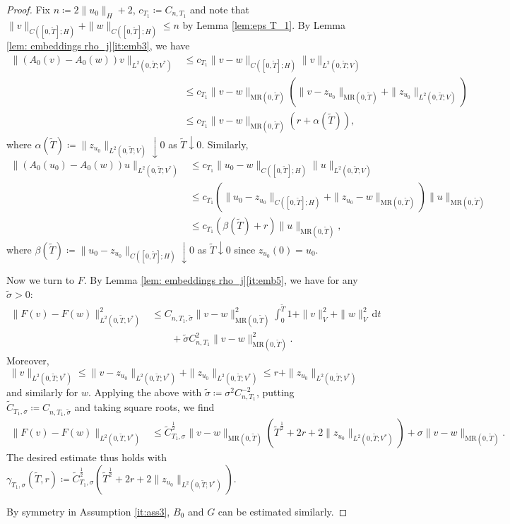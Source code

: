 \documentclass{amsart}
\newcommand{\dd}{\,\mathrm{d}}
\renewcommand{\MR}{\mathrm{MR}}
\newcommand{\<}{\langle}
\newcommand{\?}{\rangle}
\theoremstyle{plain}
\theoremstyle{remark}
\theoremstyle{plain}
\numberwithin{equation}{section}
\begin{document}
\begin{proof}
Fix $n\coloneqq 2\|u_0\|_H+2$, $c_{T_1}\coloneqq C_{n,T_1}$ and note that $\|v\|_{C([0,\tilde{T}];H)}+\|w\|_{C([0,\tilde{T}];H)}\leq n$ by Lemma \ref{lem:eps T_1}. By Lemma \ref{lem: embeddings rho_j}\ref{it:emb3}, we have
\begin{align*}
\|(A_0(v)-A_0(w))v\|_{L^2(0,\tilde{T};V^*)}&\leq c_{T_1}\|v-w\|_{C([0,\tilde{T}];H)}\|v\|_{L^2(0,\tilde{T};V)}\\
&\leq c_{T_1}\|v-w\|_{\MR(0,\tilde{T})}(\|v-z_{u_0}\|_{\MR(0,\tilde{T})}+\|z_{u_0}\|_{L^2(0,\tilde{T};V)})\\
&\leq c_{T_1}\|v-w\|_{\MR(0,\tilde{T})}(r+\alpha(\tilde{T})),
\end{align*}
where $\alpha(\tilde{T})\coloneqq \|z_{u_0}\|_{L^2(0,\tilde{T};V)}\downarrow0$ as $\tilde{T}\downarrow0$.
Similarly,
\begin{align*}
\|(A_0(u_0)-A_0(w))u\|_{L^2(0,\tilde{T};V^*)}&\leq c_{T_1}\|u_0-w\|_{C([0,\tilde{T}];H)}\|u\|_{L^2(0,\tilde{T};V)}\\
& \leq c_{T_1}(\|u_0-z_{u_0}\|_{C([0,\tilde{T}];H)}+\|z_{u_0}-w\|_{\MR(0,\tilde{T})})\|u\|_{\MR(0,\tilde{T})}\\
& \leq c_{T_1}(\beta(\tilde{T})+r)\|u\|_{\MR(0,\tilde{T})},
\end{align*}
where $\beta(\tilde{T})\coloneqq \|u_0-z_{u_0}\|_{C([0,\tilde{T}];H)}\downarrow 0$ as $\tilde{T}\downarrow0$ since $z_{u_0}(0)=u_0$.

Now we turn to $F$. By Lemma \ref{lem: embeddings rho_j}\ref{it:emb5}, we have for any $\tilde{\sigma}>0$:
\begin{align*}
 \|F(v)-F(w)\|_{L^2(0,\tilde{T},V^*)}^2&\leq  
 C_{n,T_1,\tilde{\sigma}}\|v-w\|_{\MR(0,\tilde{T})}^2\int_0^{\tilde{T}} 1+\|v\|_V^2+\|w\|_V^2\dd t\\
 &\qquad +\tilde{\sigma} C_{n,T_1}^2\|v-w\|_{\MR(0,\tilde{T})}^2.
\end{align*}
Moreover,
\[
\|v\|_{L^2(0,\tilde{T};V^*)}\leq \|v-z_{u_0}\|_{L^2(0,\tilde{T};V^*)}+\|z_{u_0}\|_{L^2(0,\tilde{T};V^*)}\leq r +\|z_{u_0}\|_{L^2(0,\tilde{T};V^*)}
\]
and similarly for $w$. Applying the above with $\tilde{\sigma}\coloneqq \sigma^2 C_{n,T_1}^{-2}$, putting $\tilde{C}_{T_1,\sigma}\coloneqq C_{n,T_1,\tilde{\sigma}}$ and taking square roots, we find 
\begin{align*}
 \|F(v)-F(w)\|_{L^2(0,\tilde{T},V^*)}&\leq  
 \tilde{C}_{T_1,{\sigma}}^{\frac{1}{2}}\|v-w\|_{\MR(0,\tilde{T})}(\tilde{T}^{\frac{1}{2}}+2r+2\|z_{u_0}\|_{L^2(0,\tilde{T};V^*)})
 +{\sigma} \|v-w\|_{\MR(0,\tilde{T})}.
\end{align*}
The desired estimate thus holds with $\gamma_{T_1,\sigma}(\tilde{T},r)\coloneqq \tilde{C}_{T_1,{\sigma}}^{\frac{1}{2}}(\tilde{T}^{\frac{1}{2}}+2r+2\|z_{u_0}\|_{L^2(0,\tilde{T};V^*)})$. 

By symmetry in Assumption \ref{it:ass3}, $B_0$ and $G$ can be estimated similarly. 
\end{proof}
\end{document}
